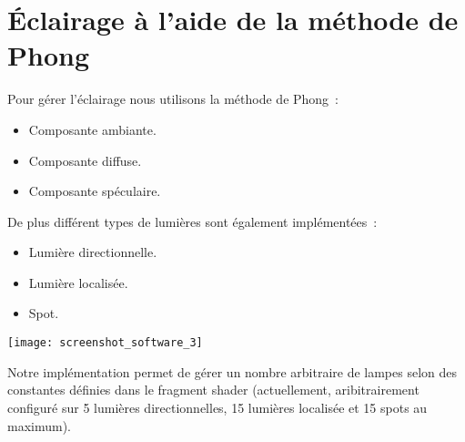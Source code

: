 \section{Éclairage à l'aide de la méthode de Phong}

Pour gérer l'éclairage nous utilisons la méthode de Phong~:
\begin{itemize}
    \item Composante ambiante.
    \item Composante diffuse.
    \item Composante spéculaire.
\end{itemize}

De plus différent types de lumières sont également implémentées~:
\begin{itemize}
    \item Lumière directionnelle.
    \item Lumière localisée.
    \item Spot.
\end{itemize}

{\centering
\texttt{[image: screenshot\_software\_3]}}

Notre implémentation permet de gérer un nombre arbitraire de lampes selon des constantes
définies dans le fragment shader (actuellement, aribitrairement configuré sur 5
lumières directionnelles, 15 lumières localisée et 15 spots au maximum).

